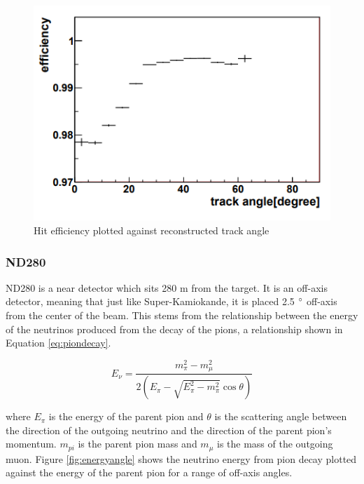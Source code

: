 \begin{figure}
    \includegraphics[width=\textwidth]{Figures/track_angle_ingrid.png}
    \caption{Hit efficiency plotted against reconstructed track angle}
    \label{fig:track_angle}
\end{figure}


\subsubsection{ND280}

ND280 is a near detector which sits 280 m from the target. It is an off-axis detector, meaning that just like Super-Kamiokande, it is placed 2.5 $\degree$ off-axis from the center of the beam. This stems from the relationship between the energy of the neutrinos produced from the decay of the pions, a relationship shown in Equation \ref{eq:piondecay}. 

\begin{equation}
    E_{\nu}=\frac{m_{\pi}^{2}-m_{\mu}^{2}}{2\left(E_{\pi}-\sqrt{E_{\pi}^{2}-m_{\pi}^{2}} \cos \theta\right)}
\label{eq:piondecay}
\end{equation}

where $E_{\pi}$ is the energy of the parent pion and $\theta$ is the scattering angle between the direction of the outgoing neutrino and the direction of the parent pion's momentum. $m_{pi}$ is the parent pion mass and $m_{\mu}$ is the mass of the outgoing muon. Figure \ref{fig:energyangle} shows the neutrino energy from pion decay plotted against the energy of the parent pion for a range of off-axis angles. 

